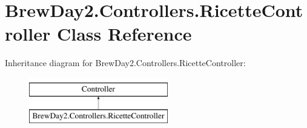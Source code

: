 \hypertarget{class_brew_day2_1_1_controllers_1_1_ricette_controller}{}\section{Brew\+Day2.\+Controllers.\+Ricette\+Controller Class Reference}
\label{class_brew_day2_1_1_controllers_1_1_ricette_controller}
Inheritance diagram for Brew\+Day2.\+Controllers.\+Ricette\+Controller\+:\begin{figure}[H]
\begin{center}
\leavevmode
\includegraphics[height=2.000000cm]{class_brew_day2_1_1_controllers_1_1_ricette_controller}
\end{center}
\end{figure}
